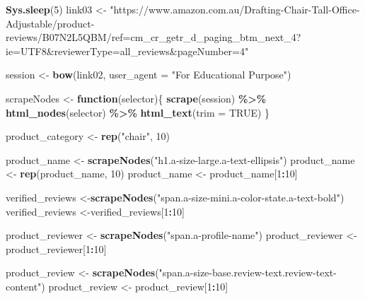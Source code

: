 \documentclass[
]{article}
\newenvironment{Shaded}{\begin{snugshade}}{\end{snugshade}}
\newcommand{\AttributeTok}[1]{\textcolor[rgb]{0.13,0.29,0.53}{#1}}
\newcommand{\ConstantTok}[1]{\textcolor[rgb]{0.56,0.35,0.01}{#1}}
\newcommand{\ControlFlowTok}[1]{\textcolor[rgb]{0.13,0.29,0.53}{\textbf{#1}}}
\newcommand{\DecValTok}[1]{\textcolor[rgb]{0.00,0.00,0.81}{#1}}
\newcommand{\FunctionTok}[1]{\textcolor[rgb]{0.13,0.29,0.53}{\textbf{#1}}}
\newcommand{\NormalTok}[1]{#1}
\newcommand{\OtherTok}[1]{\textcolor[rgb]{0.56,0.35,0.01}{#1}}
\newcommand{\SpecialCharTok}[1]{\textcolor[rgb]{0.81,0.36,0.00}{\textbf{#1}}}
\newcommand{\StringTok}[1]{\textcolor[rgb]{0.31,0.60,0.02}{#1}}
\begin{document}
\begin{Shaded}
\begin{Highlighting}[]
   \FunctionTok{Sys.sleep}\NormalTok{(}\DecValTok{5}\NormalTok{)}
\NormalTok{link03 }\OtherTok{\textless{}{-}} \StringTok{"https://www.amazon.com.au/Drafting{-}Chair{-}Tall{-}Office{-}Adjustable/product{-}reviews/B07N2L5QBM/ref=cm\_cr\_getr\_d\_paging\_btm\_next\_4?ie=UTF8\&reviewerType=all\_reviews\&pageNumber=4"}


\NormalTok{  session }\OtherTok{\textless{}{-}} \FunctionTok{bow}\NormalTok{(link02,}
               \AttributeTok{user\_agent =} \StringTok{"For Educational Purpose"}\NormalTok{)}

\NormalTok{  scrapeNodes }\OtherTok{\textless{}{-}} \ControlFlowTok{function}\NormalTok{(selector)\{}
    \FunctionTok{scrape}\NormalTok{(session) }\SpecialCharTok{\%\textgreater{}\%}
      \FunctionTok{html\_nodes}\NormalTok{(selector) }\SpecialCharTok{\%\textgreater{}\%}
      \FunctionTok{html\_text}\NormalTok{(}\AttributeTok{trim =} \ConstantTok{TRUE}\NormalTok{)}
\NormalTok{  \}}

\NormalTok{  product\_category }\OtherTok{\textless{}{-}} \FunctionTok{rep}\NormalTok{(}\StringTok{"chair"}\NormalTok{, }\DecValTok{10}\NormalTok{)}

\NormalTok{  product\_name }\OtherTok{\textless{}{-}} \FunctionTok{scrapeNodes}\NormalTok{(}\StringTok{"h1.a{-}size{-}large.a{-}text{-}ellipsis"}\NormalTok{)}
\NormalTok{  product\_name }\OtherTok{\textless{}{-}} \FunctionTok{rep}\NormalTok{(product\_name, }\DecValTok{10}\NormalTok{)}
\NormalTok{  product\_name }\OtherTok{\textless{}{-}}\NormalTok{ product\_name[}\DecValTok{1}\SpecialCharTok{:}\DecValTok{10}\NormalTok{]}
  
\NormalTok{  verified\_reviews }\OtherTok{\textless{}{-}}\FunctionTok{scrapeNodes}\NormalTok{(}\StringTok{"span.a{-}size{-}mini.a{-}color{-}state.a{-}text{-}bold"}\NormalTok{)}
\NormalTok{  verified\_reviews }\OtherTok{\textless{}{-}}\NormalTok{verified\_reviews[}\DecValTok{1}\SpecialCharTok{:}\DecValTok{10}\NormalTok{]}
  
\NormalTok{  product\_reviewer }\OtherTok{\textless{}{-}} \FunctionTok{scrapeNodes}\NormalTok{(}\StringTok{"span.a{-}profile{-}name"}\NormalTok{)}
\NormalTok{  product\_reviewer }\OtherTok{\textless{}{-}}\NormalTok{ product\_reviewer[}\DecValTok{1}\SpecialCharTok{:}\DecValTok{10}\NormalTok{]}
  
\NormalTok{  product\_review }\OtherTok{\textless{}{-}} \FunctionTok{scrapeNodes}\NormalTok{(}\StringTok{"span.a{-}size{-}base.review{-}text.review{-}text{-}content"}\NormalTok{)}
\NormalTok{  product\_review }\OtherTok{\textless{}{-}}\NormalTok{ product\_review[}\DecValTok{1}\SpecialCharTok{:}\DecValTok{10}\NormalTok{]}
  

\end{Highlighting}
\end{Shaded}
\end{document}
